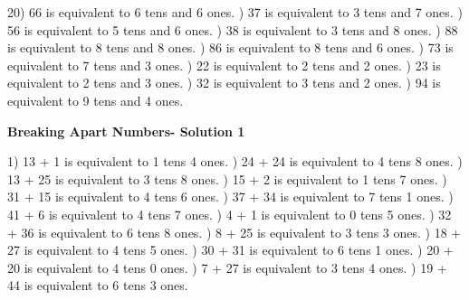 \documentclass{article}%
\begin{document}
20) 66 is equivalent to  6 tens and 6 ones.%
) 37 is equivalent to  3 tens and 7 ones.%
) 56 is equivalent to  5 tens and 6 ones.%
) 38 is equivalent to  3 tens and 8 ones.%
) 88 is equivalent to  8 tens and 8 ones.%
) 86 is equivalent to  8 tens and 6 ones.%
) 73 is equivalent to  7 tens and 3 ones.%
) 22 is equivalent to  2 tens and 2 ones.%
) 23 is equivalent to  2 tens and 3 ones.%
) 32 is equivalent to  3 tens and 2 ones.%
) 94 is equivalent to  9 tens and 4 ones.%
\newline%
\newpage%
\large%
\begin{center}%
\textbf{Breaking Apart Numbers- Solution 1}%
\newline%
\end{center} \normalsize%
1) 13 + 1 is equivalent to 1 tens 4 ones.%
) 24 + 24 is equivalent to 4 tens 8 ones.%
) 13 + 25 is equivalent to 3 tens 8 ones.%
) 15 + 2 is equivalent to 1 tens 7 ones.%
) 31 + 15 is equivalent to 4 tens 6 ones.%
) 37 + 34 is equivalent to 7 tens 1 ones.%
) 41 + 6 is equivalent to 4 tens 7 ones.%
) 4 + 1 is equivalent to 0 tens 5 ones.%
) 32 + 36 is equivalent to 6 tens 8 ones.%
) 8 + 25 is equivalent to 3 tens 3 ones.%
) 18 + 27 is equivalent to 4 tens 5 ones.%
) 30 + 31 is equivalent to 6 tens 1 ones.%
) 20 + 20 is equivalent to 4 tens 0 ones.%
) 7 + 27 is equivalent to 3 tens 4 ones.%
) 19 + 44 is equivalent to 6 tens 3 ones.%
\end{document}
